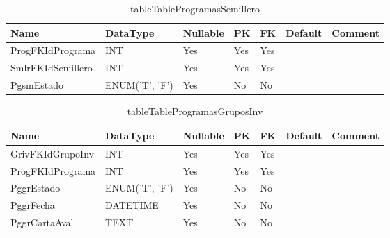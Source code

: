 \begin{table}
	\caption{tableTableProgramasSemillero}
	\label{labelTableProgramasSemillero}
	\begin{tabular}{ |l|l|l|l|l|l|l| }
		\hline
		Name & DataType & Nullable & PK & FK & Default & Comment \\ \hline
		ProgFKIdPrograma & INT & Yes & Yes & Yes &  & \\ \hline 
		SmlrFKIdSemillero & INT & Yes & Yes & Yes &  & \\ \hline 
		PgsmEstado & ENUM('T', 'F') & Yes & No & No &  & \\ \hline 
		
	\end{tabular}
\end{table}


\begin{table}
	\caption{tableTableProgramasGruposInv}
	\label{labelTableProgramasGruposInv}
	\begin{tabular}{ |l|l|l|l|l|l|l| }
		\hline
		Name & DataType & Nullable & PK & FK & Default & Comment \\ \hline
		GrivFKIdGrupoInv & INT & Yes & Yes & Yes &  & \\ \hline 
		ProgFKIdPrograma & INT & Yes & Yes & Yes &  & \\ \hline 
		PggrEstado & ENUM('T', 'F') & Yes & No & No &  & \\ \hline 
		PggrFecha & DATETIME & Yes & No & No &  & \\ \hline 
		PggrCartaAval & TEXT & Yes & No & No &  & \\ \hline 
		
	\end{tabular}
\end{table}


